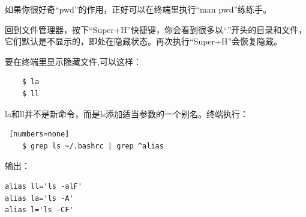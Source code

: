 \par 如果你很好奇“pwd”的作用，正好可以在终端里执行“man pwd”练练手。
\par 回到文件管理器，按下“Super+H”快捷键，你会看到很多以“.”开头的目录和文件，它们默认是不显示的，即处在隐藏状态。再次执行“Super+H”会恢复隐藏。

\par 要在终端里显示隐藏文件,可以这样：
\begin{lstlisting}
    $ la
    $ ll
\end{lstlisting}

\par la和ll并不是新命令，而是ls添加适当参数的一个别名。终端执行：
\begin{lstlisting} [numbers=none]
    $ grep ls ~/.bashrc | grep ^alias
\end{lstlisting}
\par 输出：
\begin{lstlisting}
alias ll='ls -alF'
alias la='ls -A'
alias l='ls -CF'
\end{lstlisting}


\ifx\all\undefined

\fi
